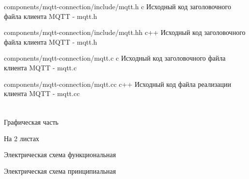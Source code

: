 \documentclass{bmstu}
\begin{document}
\begin{appendices}
        {components/mqtt-connection/include/mqtt.h} %
        {c}
        {Исходный код заголовочного файла клиента MQTT - mqtt.h} %

        {components/mqtt-connection/include/mqtt.hh} %
        {c++}
        {Исходный код заголовочного файла клиента MQTT - mqtt.h} %


        {components/mqtt-connection/mqtt.c} %
        {c}
        {Исходный код заголовочного файла клиента MQTT - mqtt.c} %

        {components/mqtt-connection/mqtt.cc} %
        {c++}
        {Исходный код файла реализации клиента MQTT - mqtt.cc} %

        \chapter{}
            {
                \centering
                Графическая часть

                На 2 листах

                Электрическая схема функциональная

                Электрическая схема принципиальная

            }
\end{appendices}
\end{document}
